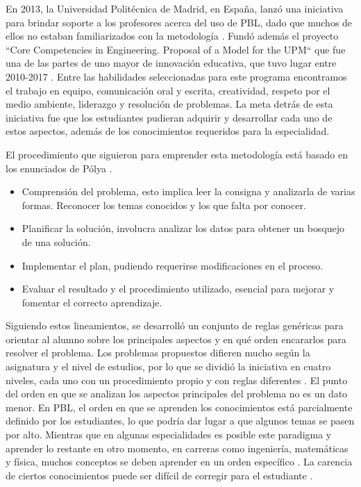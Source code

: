 \documentclass[conference]{IEEEtran}
\begin{document}
En 2013, la Universidad Politécnica de Madrid, en España, lanzó una iniciativa para brindar soporte a los profesores acerca del uso de PBL, dado que muchos de ellos no estaban familiarizados con la metodología \cite{b2}. Fundó además el proyecto ``Core Competencies in Engineering. Proposal of a Model for the UPM`` que fue una de las partes de uno mayor de innovación educativa, que tuvo lugar entre 2010-2017 \cite{b10}. Entre las habilidades seleccionadas para este programa encontramos el trabajo en equipo, comunicación oral y escrita, creatividad, respeto por el medio ambiente, liderazgo y resolución de problemas. La meta detrás de esta iniciativa fue que los estudiantes pudieran adquirir y desarrollar cada uno de estos aspectos, además de los conocimientos requeridos para la especialidad.

El procedimiento que siguieron para emprender esta metodología está basado en los enunciados de Pólya \cite{b10}.

\begin{itemize}
    \item Comprensión del problema, esto implica leer la consigna y analizarla de varias formas. Reconocer los temas conocidos y los que falta por conocer.
    \item Planificar la solución, involucra analizar los datos para obtener un bosquejo de una solución.
    \item Implementar el plan, pudiendo requerirse modificaciones en el proceso.
    \item Evaluar el resultado y el procedimiento utilizado, esencial para mejorar y fomentar el correcto aprendizaje.
\end{itemize}

Siguiendo estos lineamientos, se desarrolló un conjunto de reglas genéricas para orientar al alumno sobre los principales aspectos y en qué orden encararlos para resolver el problema. Los problemas propuestos difieren mucho según la asignatura y el nivel de estudios, por lo que se dividió la iniciativa en cuatro niveles, cada uno con un procedimiento propio y con reglas diferentes \cite{b10}. El punto del orden en que se analizan los aspectos principales del problema no es un dato menor. En PBL, el orden en que se aprenden los conocimientos está parcialmente definido por los estudiantes, lo que podría dar lugar a que algunos temas se pasen por alto. Mientras que en algunas especialidades es posible este paradigma y aprender lo restante en otro momento, en carreras como ingeniería, matemáticas y física, muchos conceptos 	se deben aprender en un orden específico	. La carencia de ciertos conocimientos puede ser difícil de corregir para el estudiante \cite{b12}.
\end{document}
